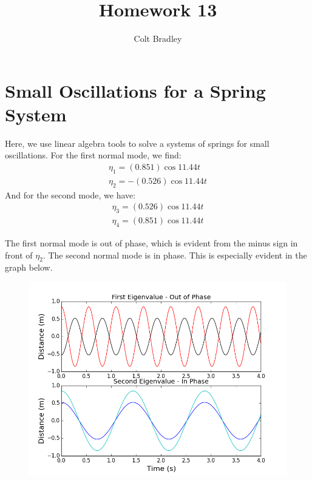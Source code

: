 \documentclass[11pt]{article}
\begin{document}
\title{Homework 13}
\author{Colt Bradley}
\date{}
\maketitle

\section{Small Oscillations for a Spring System}
Here, we use linear algebra tools to solve a systems of springs for small oscillations. 
For the first normal mode, we find:
\begin{subequations}
\begin{align}
\eta_1 = (0.851) \cos 11.44 t \\
\eta_2 = -(0.526) \cos 11.44 t
\end{align}
\end{subequations}
And for the second mode, we have:
\begin{subequations}
\begin{align}
\eta_3 = (0.526) \cos 11.44 t \\
\eta_4 = (0.851) \cos 11.44 t
\end{align}
\end{subequations}

The first normal mode is out of phase, which is evident from the minus sign in front of $\eta_2$. The second normal mode is in phase. This is especially evident in the graph below. 


\begin{figure}[ht]
\centering
\includegraphics[scale=.45]{fig.png}
\end{figure}
\end{document}
